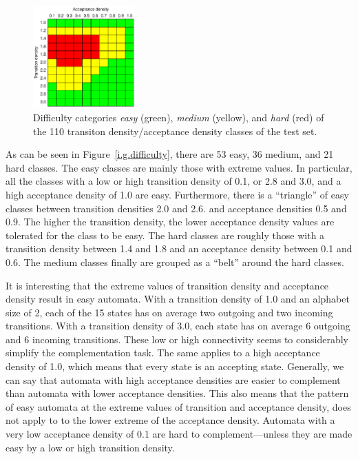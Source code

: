 \begin{figure}[ht]
\centering
\includegraphics[width=0.35\textwidth]{figures/r/internal/goal/difficulty.pdf}
\caption{Difficulty categories \textit{easy} (green), \textit{medium} (yellow), and \textit{hard} (red) of the 110 transiton density/acceptance density classes of the \goal{} test set.}
\end{figure}

As can be seen in Figure~\ref{i.g.difficulty}, there are 53 easy, 36 medium, and 21 hard classes. The easy classes are mainly those with extreme values. In particular, all the classes with a low or high transition density of 0.1, or 2.8 and 3.0, and a high acceptance density of 1.0 are easy. Furthermore, there is a ``triangle'' of easy classes between transition densities 2.0 and 2.6. and acceptance densities 0.5 and 0.9. The higher the transition density, the lower acceptance density values are tolerated for the class to be easy. The hard classes are roughly those with a transition density between 1.4 and 1.8 and an acceptance density between 0.1 and 0.6. The medium classes finally are grouped as a ``belt'' around the hard classes.

It is interesting that the extreme values of transition density and acceptance density result in easy automata. With a transition density of 1.0 and an alphabet size of 2, each of the 15 states has on average two outgoing and two incoming transitions. With a transition density of 3.0, each state has on average 6 outgoing and 6 incoming transitions. These low or high connectivity seems to considerably simplify the complementation task. The same applies to a high acceptance density of 1.0, which means that every state is an accepting state. Generally, we can say that automata with high acceptance densities are easier to complement than automata with lower acceptance densities. This also means that the pattern of easy automata at the extreme values of transition and acceptance density, does not apply to to the lower extreme of the acceptance density. Automata with a very low acceptance density of 0.1 are hard to complement---unless they are made easy by a low or high transition density.

